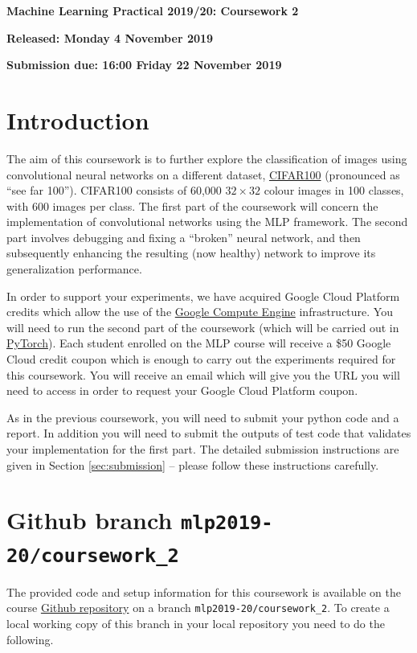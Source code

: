 \documentclass[11pt,]{article}
\begin{document}
\begin{center}
\textsf{\textbf{\Large Machine Learning Practical 2019/20: Coursework 2}}

\bigskip
\textbf{Released: Monday 4 November 2019}

\textbf{Submission due: 16:00 Friday 22 November 2019}
\end{center}
\section{Introduction}
\label{sec:introduction}

The aim of this coursework is to further explore the classification of images using convolutional neural networks on a different dataset, \href{https://www.cs.toronto.edu/~kriz/cifar.html}{CIFAR100} (pronounced as ``see far 100''). CIFAR100 consists of 60,000 $32 \times 32$ colour images in 100 classes, with 600 images per class. The first part of the coursework will concern the implementation of convolutional networks using the MLP framework. The second part involves debugging and fixing a ``broken'' neural network, and then subsequently enhancing the resulting (now healthy) network to improve its generalization performance.

In order to support your experiments, we have acquired Google Cloud Platform credits which allow the use of the  \href{https://cloud.google.com/compute/docs/}{Google Compute Engine} infrastructure.
You will need to run the second part of the coursework (which will be carried out in \href{https://pytorch.org}{PyTorch}). Each student enrolled on the MLP course will receive a \$50 Google Cloud credit coupon which is enough to carry out the experiments required for this coursework. You will receive an email which will give you the URL you will need to access in order to request your Google Cloud Platform coupon. 

As in the previous coursework, you will need to submit your python code and a report.  In addition you will need to submit the outputs of test code that validates your implementation for the first part. The detailed submission instructions are given in Section \ref{sec:submission} -- please follow these instructions carefully.

\section{Github branch \texttt{mlp2019-20/coursework\_2}}
\label{sec:code}

The provided code and setup information for this coursework is available on the course
\href{https://github.com/CSTR-Edinburgh/mlpractical/}{Github repository}
on a branch \verb+mlp2019-20/coursework_2+. To create a local working
copy of this branch in your local repository you need to do the
following.
\end{document}
